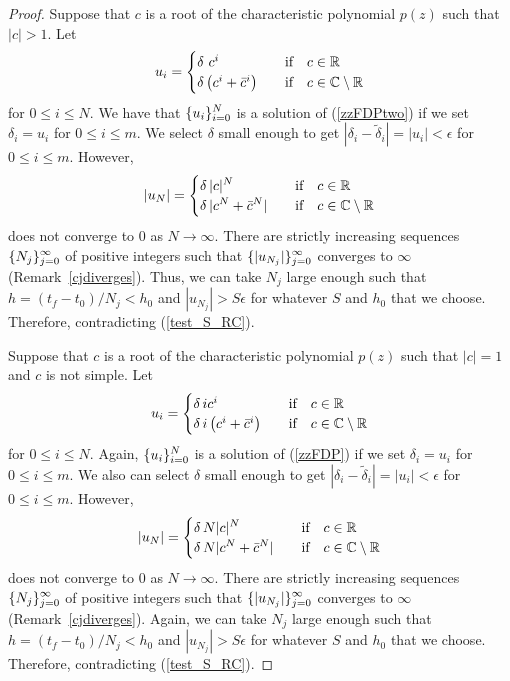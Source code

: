 \begin{proof}
Suppose that $c$ is a root of the characteristic polynomial $p(z)$
such that $|c|>1$.  Let
\[
u_i = \begin{cases}
\delta\ c^i & \quad \text{if} \quad c \in \mathbb{R} \\
\delta \left( c^i + \bar{c}^i \right) & \quad \text{if} \quad
c \in \mathbb{C} \setminus \mathbb{R}
\end{cases}
\]
for $0 \leq i \leq N$.  We have that
$\displaystyle \{u_i\}_{i=0}^N$ is a solution of
(\ref{zzFDPtwo}) if we set $\delta_i = u_i$ for $0\leq i \leq m$.
We select $\delta$ small enough to get
$|\delta_i - \tilde{\delta}_i| = |u_i| < \epsilon$ for $0\leq i \leq m$.
However,
\[
|u_N| =
\begin{cases}
\displaystyle \delta\,|c|^N  & \quad \text{if}\quad c \in \mathbb{R} \\
\displaystyle \delta\,|c^N + \bar{c}^N| &
\quad \text{if}\quad c \in \mathbb{C}\setminus \mathbb{R}
\end{cases}
\]
does not converge to $0$ as $N \to \infty$.  There are strictly
increasing sequences $\displaystyle \{N_j\}_{j=0}^\infty$ of positive integers
such that $\displaystyle \{|u_{N_j}|\}_{j=0}^\infty$ converges to  $\infty$
(Remark~\ref{cjdiverges}).
Thus, we can take $N_j$ large enough such that 
$h = (t_f-t_0)/N_j < h_0$ and $|u_{N_j}| > S\epsilon$ for whatever $S$
and $h_0$ that we choose.  Therefore,
contradicting (\ref{test_S_RC}).

Suppose that $c$ is a root of the characteristic polynomial $p(z)$
such that $|c|=1$ and $c$ is not simple.  Let
\[
u_i = \begin{cases}
\delta\,i c^i & \quad \text{if} \quad c \in \mathbb{R} \\
\delta\, i \left( c^i + \bar{c}^i \right) & \quad \text{if}\quad  c \in \mathbb{C}
\setminus \mathbb{R}
\end{cases}
\]
for $0 \leq i \leq N$.
Again, $\displaystyle \{u_i\}_{i=0}^N$ is a solution of (\ref{zzFDP}) if we set
$\delta_i = u_i$ for $0\leq i \leq m$.  We also can select $\delta$
small enough to get
$|\delta_i - \tilde{\delta}_i| = |u_i| < \epsilon$ for $0\leq i \leq m$.
However,
\[
|u_N| =
\begin{cases}
\displaystyle
\delta\,N |c|^N & \quad \text{if}\quad c \in \mathbb{R} \\
\displaystyle \delta\,N |c^N + \bar{c}^N| &
\quad \text{if}\quad c \in \mathbb{C} \setminus \mathbb{R}
\end{cases}
\]
does not converge to $0$ as $N \to \infty$.   There are strictly
increasing sequences $\displaystyle \{N_j\}_{j=0}^\infty$ of positive integers
such that $\displaystyle \{|u_{N_j}|\}_{j=0}^\infty$ converges to  $\infty$
(Remark~\ref{cjdiverges}).
Again, we can take $N_j$ large enough such that
$h = (t_f-t_0)/N_j < h_0$ and $|u_{N_j}| > S\epsilon$ for whatever $S$
and $h_0$ that we choose.  Therefore, contradicting (\ref{test_S_RC}).
\end{proof}

